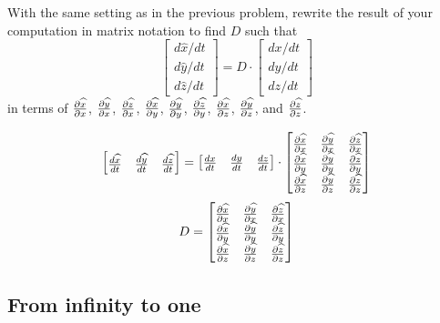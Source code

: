 \documentclass[newpage,hints,handout,12pt,noauthor,nooutcomes]{ximera}
\begin{document}
\begin{problem}
  With the same setting as in the previous problem, rewrite the result
  of your computation in matrix notation to find $D$ such that
\[
\begin{bmatrix}
d\hat{x}/dt \\ d\hat{y}/dt \\ d\hat{z}/dt%
\end{bmatrix}
=D \cdot \begin{bmatrix}
dx/dt \\ dy/dt \\ dz/dt
\end{bmatrix}
\]
in terms of $\pp[\hat x]{x}$, $\pp[\hat y]{x}$, $\pp[\hat z]{x}$,
$\pp[\hat x]{y}$, $\pp[\hat y]{y}$, $\pp[\hat z]{y}$, $\pp[\hat x]{z}$,
$\pp[\hat y]{z}$, and $\pp[\hat z]{z}$.

\begin{freeResponse}
\[
\begin{bmatrix}
\frac{d\hat{x}}{dt} & \frac{d\hat{y}}{dt} & \frac{d\hat{z}}{dt}%
\end{bmatrix}
=
\begin{bmatrix}
\frac{dx}{dt} & \frac{dy}{dt} & \frac{dz}{dt}%
\end{bmatrix}\cdot
\begin{bmatrix}
\pp[\hat x]{x} & \pp[\hat y]{x} & \pp[\hat z]{x} \\
\pp[\hat x]{y} & \pp[\hat y]{y} & \pp[\hat z]{y} \\
\pp[\hat x]{z} &\pp[\hat y]{z} & \pp[\hat z]{z}
\end{bmatrix}
\]
\[
D = 
\begin{bmatrix}
\pp[\hat x]{x} & \pp[\hat y]{x} & \pp[\hat z]{x} \\
\pp[\hat x]{y} & \pp[\hat y]{y} & \pp[\hat z]{y} \\
\pp[\hat x]{z} &\pp[\hat y]{z} & \pp[\hat z]{z}
\end{bmatrix}
\]

\end{freeResponse}
\end{problem}












\subsection{From infinity to one}
\end{document}
